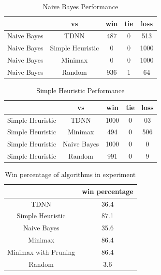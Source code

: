 \documentclass[12pt,letterpaper]{article}
\begin{document}
\begin{table}[h]
\begin{center}
\begin{tabular}{|c||c|c|c|c|}
\hline
& vs & win & tie & loss\\
\hline \hline
Naive Bayes & TDNN & 487 & 0 & 513\\
\hline 
Naive Bayes & Simple Heuristic & 0 & 0 & 1000\\
\hline 
Naive Bayes & Minimax & 0 & 0 & 1000\\
\hline 
Naive Bayes & Random & 936 & 1 & 64\\
\hline 
\end{tabular}
\end{center}
\caption{Naive Bayes Performance}
\label{NaiveBayesTable}
\end{table}

\begin{table}[h]
\begin{center}
\begin{tabular}{|c||c|c|c|c|}
\hline
& vs & win & tie & loss\\
\hline \hline
Simple Heuristic & TDNN & 1000 & 0 & 03\\
\hline 
Simple Heuristic & Minimax & 494 & 0 & 506\\
\hline 
Simple Heuristic & Naive Bayes & 1000 & 0 & 0\\
\hline 
Simple Heuristic & Random & 991 & 0 & 9\\
\hline 
\end{tabular}
\end{center}
\caption{Simple Heuristic Performance}
\label{HeuristicTable}
\end{table}

\begin{table}[h]
\begin{center}
\begin{tabular}{|c||c|}
\hline
& win percentage\\
\hline \hline
TDNN & 36.4\\
\hline 
Simple Heuristic & 87.1\\
\hline 
Naive Bayes & 35.6\\
\hline 
Minimax & 86.4\\
\hline 
Minimax with Pruning & 86.4\\
\hline 
Random & 3.6\\
\hline 
\end{tabular}
\end{center}
\caption{Win percentage of algorithms in experiment}
\label{WinPercentTable}
\end{table}
\end{document}
